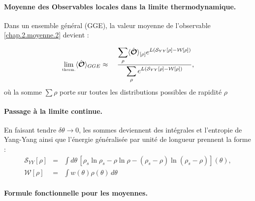 

\paragraph{Moyenne des Observables locales dans la limite thermodynamique.}

Dans un ensemble général (GGE), la valeur moyenne de l’observable \eqref{chap.2.moyenne.2} devient :	
	
\begin{eqnarray}\label{chap.2.moyenne.3}
	\underset{\mbox{\tiny therm.}}{\lim} \langle \hat{\bm{\mathcal{O}}} \rangle_{GGE} &  \approx &  ~ \frac{  \displaystyle \sum_{\rho }  \langle \hat{\bm{\mathcal{O}}}\rangle_{[\rho]}  e^{L(\mathcal{S}_{YY}[\rho] -  \mathcal{W}[\rho]) }}{ \displaystyle \sum_{\rho } e^{L(\mathcal{S}_{YY}[\rho] -  \mathcal{W}[\rho]) } },
\end{eqnarray}
où la somme $\sum\rho$ porte sur toutes les distributions possibles de rapidité $\rho$

\paragraph{Passage à la limite continue.}
En faisant tendre $\delta\theta \to 0$, les sommes deviennent des intégrales 
et l'entropie de Yang-Yang ainsi que l’énergie généralisée par unité de longueur prennent la forme :
\begin{eqnarray}
	\mathcal{S}_{YY}[\rho] & = & \int d \theta  \, [ \rho_s\ln \rho_s - \rho \ln \rho - ( \rho_s - \rho ) \ln ( \rho_s - \rho ) ] (\theta) ,\\
	\mathcal{W}[\rho] & = & \int   w(\theta) \rho(\theta) \, d \theta 		
\end{eqnarray}

\paragraph{Formule fonctionnelle pour les moyennes.}

